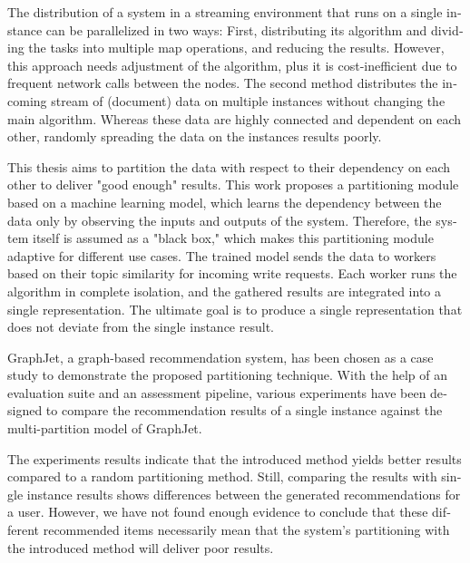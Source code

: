 
\null\vfil
\begin{otherlanguage}{english}
\begin{center}\textsf{\textbf{\abstractname}}\end{center}

\noindent
The distribution of a system in a streaming environment that runs on a single instance can be parallelized in two ways: First, distributing its algorithm and dividing the tasks into multiple map operations, and reducing the results. However, this approach needs adjustment of the algorithm, plus it is cost-inefficient due to frequent network calls between the nodes. The second method distributes the incoming stream of (document) data on multiple instances without changing the main algorithm. Whereas these data are highly connected and dependent on each other, randomly spreading the data on the instances results poorly.

This thesis aims to partition the data with respect to their dependency on each other to deliver "good enough" results. This work proposes a partitioning module based on a machine learning model, which learns the dependency between the data only by observing the inputs and outputs of the system. Therefore, the system itself is assumed as a "black box," which makes this partitioning module adaptive for different use cases. The trained model sends the data to workers based on their topic similarity for incoming write requests. Each worker runs the algorithm in complete isolation, and the gathered results are integrated into a single representation. The ultimate goal is to produce a single representation that does not deviate from the single instance result.

GraphJet, a graph-based recommendation system, has been chosen as a case study to demonstrate the proposed partitioning technique. With the help of an evaluation suite and an assessment pipeline, various experiments have been designed to compare the recommendation results of a single instance against the multi-partition model of GraphJet.


The experiments results indicate that the introduced method yields better results compared to a random partitioning method. Still, comparing the results with single instance results shows differences between the generated recommendations for a user. However, we have not found enough evidence to conclude that these different recommended items necessarily mean that the system's partitioning with the introduced method will deliver poor results.


\end{otherlanguage}
\vfil\null
\newpage


